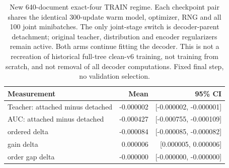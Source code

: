 \begin{table}[H]
\centering\small
\begin{tabularx}{\linewidth}{Yrr}
\toprule
Measurement & Mean & 95\% CI \\
\midrule
Teacher: attached minus detached & -0.000002 & [-0.000002, -0.000001] \\
AUC: attached minus detached & -0.000427 & [-0.000755, -0.000109] \\
ordered delta & -0.000084 & [-0.000085, -0.000082] \\
gain delta & 0.000006 & [0.000005, 0.000006] \\
order gap delta & -0.000000 & [-0.000000, -0.000000] \\
\bottomrule
\end{tabularx}
\caption{New 640-document exact-four TRAIN regime. Each checkpoint pair shares the identical 300-update warm model, optimizer, RNG and all 100 joint minibatches. The only joint-stage switch is decoder-parent detachment; original teacher, distribution and encoder regularizers remain active. Both arms continue fitting the decoder. This is not a recreation of historical full-tree clean-v6 training, not training from scratch, and not removal of all decoder computations. Fixed final step, no validation selection.}
\label{tab:decoder-gradient}
\end{table}
